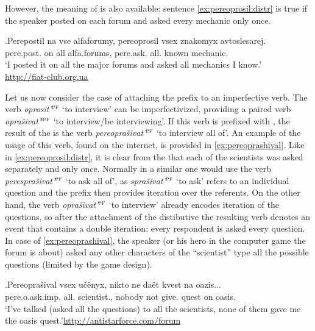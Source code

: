 However, the  meaning of  is also available: sentence \ref{ex:pereoprosil:distr} is true if the speaker posted on each forum and asked every mechanic only once.

\exg.\label{ex:pereoprosil:distr}Perepostil na vse alfaforumy, pereoprosil vsex znakomyx avtoslesarej.\\ 
pere.post. on all {alfa.forums}, pere.ask. all. known mechanic.\\
\trans `I posted it on all the major forums and asked all mechanics I know.'\\\hbox{}\hfill\hbox{\url{http://fiat-club.org.ua}}

Let us now consider the case of attaching the prefix  to an imperfective verb. The verb \textit{oprosit'}$^{\textsc{pf}}$ `to interview' can be imperfectivized, providing a paired verb \textit{opra\v{s}ivat'}$^{\textsc{ipf}}$ `to interview/be interviewing'. If this verb is prefixed with , the result of the  is the verb \textit{pereopra\v{s}ivat'}$^{\textsc{pf}}$ `to interview all of'. An example of the usage of this verb, found on the internet, is provided in \ref{ex:pereoprashival}. Like in \ref{ex:pereoprosil:distr}, it is clear from the  that each of the scientists was asked separately and only once. Normally in a similar  one would use the verb \textit{perespra\v{s}ivat'}$^{\textsc{pf}}$ `to ask all of', as \textit{spra\v{s}ivat'}$^{\textsc{pf}}$ `to ask' refers to an individual question and the prefix  then provides iteration over the referents. On the other hand, the verb \textit{opra\v{s}ivat'}$^{\textsc{pf}}$ `to interview' already encodes iteration of the questions, so after the attachment of the distibutive  the resulting verb denotes an event that contains a double iteration: every respondent is asked every question. In case of \ref{ex:pereoprashival}, the speaker (or his hero in the computer game the forum is about) asked any other characters of the ``scientist'' type all the possible questions (limited by the game design).

\exg.\label{ex:pereoprashival}Pereopra\v{s}ival vsex u\v{c}\"{e}nyx, nikto ne da\"{e}t kvest na oazis...\\
pere.o.ask.imp. all. scientist., nobody not give. quest on oasis.\\
\trans `I've talked (asked all the questions) to all the scientists, none of them gave me the oasis quest.'\hbox{}\hfill\hbox{\url{http://antistarforce.com/forum}}

